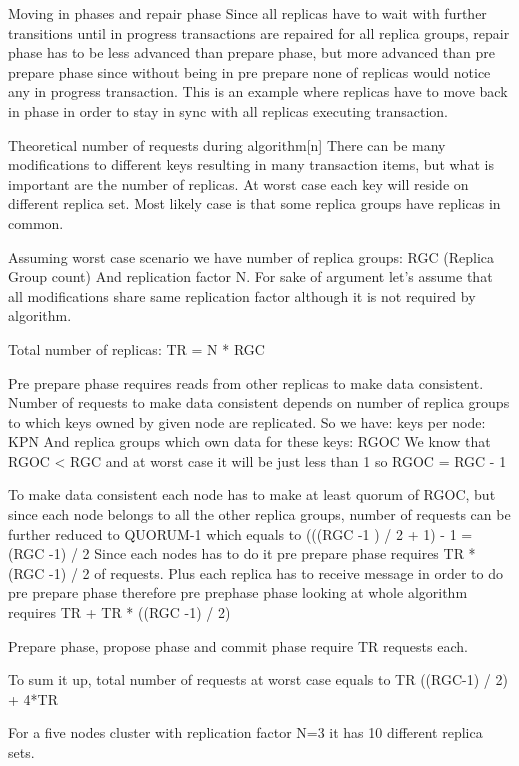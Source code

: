         Moving in phases and repair phase
Since all replicas have to wait with further transitions until in progress transactions are repaired for all replica groups, repair phase has to be less advanced than prepare phase, but more advanced than pre prepare phase since without being in pre prepare none of replicas would notice any in progress transaction. This is an example where replicas have to move back in phase in order to stay in sync with all replicas executing transaction.




Theoretical number of requests during algorithm[n]
There can be many modifications to different keys resulting in many transaction items, but what is important are the number of replicas. At worst case each key will reside on different replica set. Most likely case is that some replica groups have replicas in common.


Assuming worst case scenario we have number of replica groups: RGC (Replica Group count)
And replication factor N. For sake of argument let’s assume that all modifications share same replication factor although it is not required by algorithm.


Total number of replicas: TR = N * RGC


Pre prepare phase requires reads from other replicas to make data consistent. Number of requests to make data consistent depends on number of replica groups to which keys owned by given node are replicated. So we have:
keys per node: KPN
And replica groups which own data for these keys: RGOC
We know that RGOC < RGC and at worst case it will be just less than 1 so RGOC = RGC - 1


To make data consistent each node has to make at least quorum of RGOC, but since each node belongs to all the other replica groups, number of requests can be further reduced to QUORUM-1 which equals to (((RGC -1 ) / 2 + 1) - 1 = (RGC -1) / 2
Since each nodes has to do it pre prepare phase requires TR * (RGC -1) / 2 of requests. Plus each replica has to receive message in order to do pre prepare phase therefore pre prephase phase looking at whole algorithm requires TR + TR * ((RGC -1) / 2) 


Prepare phase, propose phase and commit phase require TR requests each.


To sum it up, total number of requests at worst case equals to 
TR ((RGC-1) / 2) + 4*TR


For a five nodes cluster with replication factor N=3 it has
10 different replica sets.




